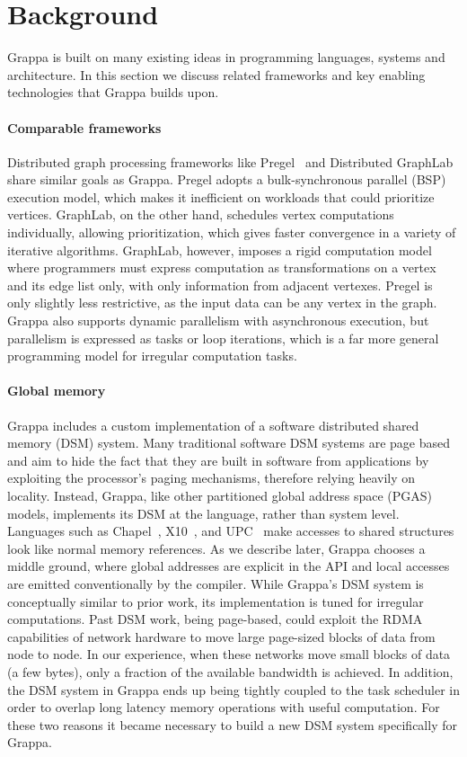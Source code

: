 \section{Background}

Grappa is built on many existing ideas in programming languages, systems and
architecture. In this section we discuss related frameworks and key enabling
technologies that Grappa builds upon.

\paragraph{Comparable frameworks} Distributed graph processing
frameworks like Pregel~\cite{pregel:2010} and Distributed
GraphLab~\cite{distgraphlab:vldb12} share similar goals as
Grappa. Pregel adopts a bulk-synchronous parallel (BSP) execution
model, which makes it inefficient on workloads that could prioritize
vertices. GraphLab, on the other hand, schedules vertex computations
individually, allowing prioritization, which gives faster convergence
in a variety of iterative algorithms.  GraphLab, however, imposes a
rigid computation model where programmers must express computation as
transformations on a vertex and its edge list only, with only
information from adjacent vertexes. Pregel is only slightly less
restrictive, as the input data can be any vertex in the graph.  Grappa
also supports dynamic parallelism with asynchronous execution, but
parallelism is expressed as tasks or loop iterations, which is a far
more general programming model for irregular computation tasks.

\paragraph{Global memory} Grappa includes a custom implementation of a
software distributed shared memory (DSM) system. Many traditional
software DSM systems are page based~\cite{Treadmarks,munin} and aim to
hide the fact that they are built in software from applications by
exploiting the processor's paging mechanisms, therefore relying
heavily on locality. Instead, Grappa, like other partitioned global
address space (PGAS) models, implements its DSM at the language,
rather than system level. Languages such as
Chapel~\cite{Chamberlain:2007}, X10~\cite{X10:2005}, and
UPC~\cite{upc:2005} make accesses to shared structures look like
normal memory references. As we describe later, Grappa chooses a
middle ground, where global addresses are explicit in the API and
local accesses are emitted conventionally by the compiler.  While
Grappa's DSM system is conceptually similar to prior work, its
implementation is tuned for irregular computations.  Past DSM work,
being page-based, could exploit the RDMA capabilities of network
hardware to move large page-sized blocks of data from node to node.
In our experience, when these networks move small blocks of data (a
few bytes), only a fraction of the available bandwidth is achieved.
In addition, the DSM system in Grappa ends up being tightly coupled to
the task scheduler in order to overlap long latency memory operations
with useful computation.  For these two reasons it became necessary to
build a new DSM system specifically for Grappa.


